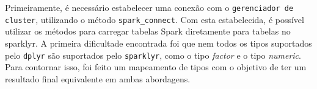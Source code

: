 Primeiramente, é necessário estabelecer uma conexão com o \texttt{gerenciador de cluster}, utilizando o método \texttt{spark\_connect}.
Com esta estabelecida, é possível utilizar os métodos para carregar tabelas Spark diretamente para tabelas no sparklyr. A primeira
dificultade encontrada foi que nem todos os tipos suportados pelo \texttt{dplyr} são suportados pelo \texttt{sparklyr}, como o tipo \emph{factor} e o tipo \emph{numeric}. Para contornar isso, foi feito um mapeamento de tipos com o objetivo de ter um resultado final equivalente em ambas abordagens.

